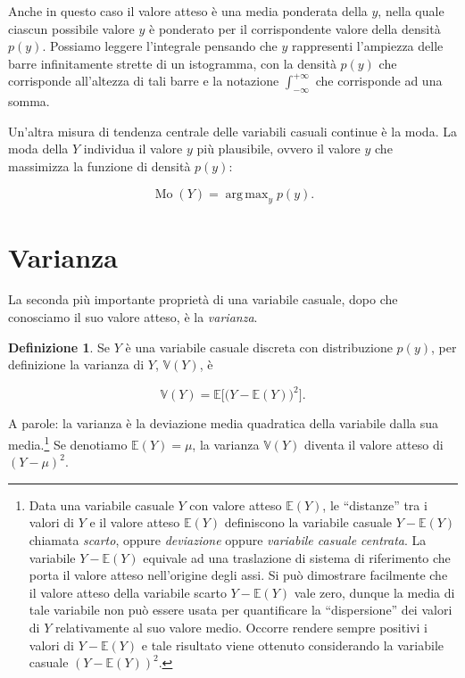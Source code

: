 \documentclass[
  11pt,
]{krantz}
\DeclareMathOperator{\Mo}{Mo} %
\DeclareMathOperator{\argmax}{arg\,max}
\newcommand{\E}{\mathbb{E}} %
\theoremstyle{definition}
\newtheorem{definition}{Definizione}[chapter]
\theoremstyle{definition}
\theoremstyle{definition}
\theoremstyle{definition}
\theoremstyle{remark}
\begin{document}
Anche in questo caso il valore atteso è una media ponderata della \(y\), nella quale ciascun possibile valore \(y\) è ponderato per il corrispondente valore della densità \(p(y)\). Possiamo leggere l'integrale pensando che \(y\) rappresenti l'ampiezza delle barre infinitamente strette di un istogramma, con la densità \(p(y)\) che corrisponde all'altezza di tali barre e la notazione \(\int_{-\infty}^{+\infty}\) che corrisponde ad una somma.

Un'altra misura di tendenza centrale delle variabili casuali continue è la moda. La moda della \(Y\) individua il valore \(y\) più plausibile, ovvero il valore \(y\) che massimizza la funzione di densità \(p(y)\):

\begin{equation}
\Mo(Y) = \argmax_y p(y).
\label{eq:def-mode}
\end{equation}

\hypertarget{varianza}{%
\section{Varianza}\label{varianza}}

La seconda più importante proprietà di una variabile casuale, dopo che conosciamo il suo valore atteso, è la \emph{varianza}.

\begin{definition}
Se \(Y\) è una variabile casuale discreta con distribuzione \(p(y)\), per definizione la varianza di \(Y\), \(\mathbb{V}(Y)\), è

\begin{equation}
\mathbb{V}(Y) = \E\Big[\big(Y - \E(Y)\big)^2\Big].
\label{eq:def-var-rv}
\end{equation}
\end{definition}

A parole: la varianza è la deviazione media quadratica della variabile dalla sua media.\footnote{Data una variabile casuale \(Y\) con valore atteso \(\E(Y)\), le ``distanze'' tra i valori di \(Y\) e il valore atteso \(\E(Y)\) definiscono la variabile casuale \(Y - \E(Y)\) chiamata \emph{scarto}, oppure \emph{deviazione} oppure \emph{variabile casuale centrata}. La variabile \(Y - \E(Y)\) equivale ad una traslazione di sistema di riferimento che porta il valore atteso nell'origine degli assi. Si può dimostrare facilmente che il valore atteso della variabile scarto \(Y - \E(Y)\) vale zero, dunque la media di tale variabile non può essere usata per quantificare la ``dispersione'' dei valori di \(Y\) relativamente al suo valore medio. Occorre rendere sempre positivi i valori di \(Y - \E(Y)\) e tale risultato viene ottenuto considerando la variabile casuale \(\left(Y - \E(Y)\right)^2\).} Se denotiamo \(\E(Y) = \mu\), la varianza \(\mathbb{V}(Y)\) diventa il valore atteso di \((Y - \mu)^2\).
\end{document}
